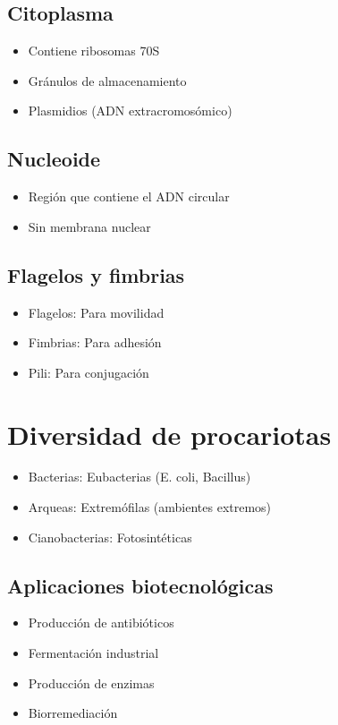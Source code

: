 \subsection{Citoplasma}
\begin{itemize}
    \item Contiene ribosomas 70S
    \item Gránulos de almacenamiento
    \item Plasmidios (ADN extracromosómico)
\end{itemize}

\subsection{Nucleoide}
\begin{itemize}
    \item Región que contiene el ADN circular
    \item Sin membrana nuclear
\end{itemize}

\subsection{Flagelos y fimbrias}
\begin{itemize}
    \item Flagelos: Para movilidad
    \item Fimbrias: Para adhesión
    \item Pili: Para conjugación
\end{itemize}

\section{Diversidad de procariotas}

\begin{itemize}
    \item Bacterias: Eubacterias (E. coli, Bacillus)
    \item Arqueas: Extremófilas (ambientes extremos)
    \item Cianobacterias: Fotosintéticas
\end{itemize}

\subsection{Aplicaciones biotecnológicas}
\begin{itemize}
    \item Producción de antibióticos
    \item Fermentación industrial
    \item Producción de enzimas
    \item Biorremediación
\end{itemize}